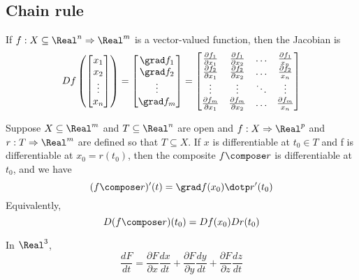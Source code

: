 \subsection{Chain rule}


\begin{definition}[Jacobian]
  If $f: X \subseteq \Real^n \Rightarrow \Real^m$ is a vector-valued function, then the Jacobian is
  \[
    Df\left(\begin{bmatrix}
      x_1 \\
      x_2 \\
      \vdots \\
      x_n
    \end{bmatrix}\right) = \begin{bmatrix}
      \grad f_1 \\
      \grad f_2 \\
      \vdots \\
      \grad f_m
    \end{bmatrix} = \begin{bmatrix}
      \frac{\partial f_1}{\partial x_1} & \frac{\partial f_1}{\partial x_2} & \hdots & \frac{\partial f_1}{x_n} \\
      \frac{\partial f_2}{\partial x_1} & \frac{\partial f_2}{\partial x_2} & \hdots & \frac{\partial f_2}{x_n} \\
      \vdots & \vdots & \ddots & \vdots \\
      \frac{\partial f_m}{\partial x_1} & \frac{\partial f_m}{\partial x_2} & \hdots & \frac{\partial f_m}{x_n} \\
    \end{bmatrix}
  \]
\end{definition}

\begin{theorem}
  Suppose $X \subseteq \Real^m$ and $T \subseteq \Real^n$ are open and $f : X \Rightarrow \Real^p$ and
  $r : T \Rightarrow \Real^m$ are defined so that $T \subseteq X$. If $x$ is
  differentiable at $t_0 \in T$ and f is differentiable at $x_0 = r(t_0)$, then
  the composite $f \compose r$ is differentiable at $t_0$, and we have
  \[
    (f \compose r)'(t) = \grad f(x_0) \dotp r'(t_0)
  \]
  Equivalently,
  \[
    D(f \compose r)(t_0) = Df(x_0) Dr(t_0)
  \]

  In $\Real^3$,
  \[
    \frac{dF}{dt} = \frac{\partial F}{\partial x} \frac{dx}{dt} + \frac{\partial F}{\partial y} \frac{dy}{dt} + \frac{\partial F}{\partial z} \frac{dz}{dt}
  \]
\end{theorem}

